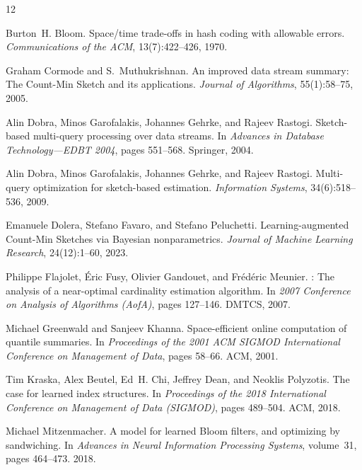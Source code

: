 \documentclass[preprint]{article}
\begin{document}
\begin{thebibliography}{12}

Burton~H. Bloom.
\newblock Space/time trade-offs in hash coding with allowable errors.
\newblock \emph{Communications of the ACM}, 13(7):422--426, 1970.

Graham Cormode and S.~Muthukrishnan.
\newblock An improved data stream summary: The {Count-Min Sketch} and its applications.
\newblock \emph{Journal of Algorithms}, 55(1):58--75, 2005.

Alin Dobra, Minos Garofalakis, Johannes Gehrke, and Rajeev Rastogi.
\newblock Sketch-based multi-query processing over data streams.
\newblock In \emph{Advances in Database Technology---EDBT 2004}, pages 551--568. Springer, 2004.

Alin Dobra, Minos Garofalakis, Johannes Gehrke, and Rajeev Rastogi.
\newblock Multi-query optimization for sketch-based estimation.
\newblock \emph{Information Systems}, 34(6):518--536, 2009.

Emanuele Dolera, Stefano Favaro, and Stefano Peluchetti.
\newblock Learning-augmented {Count-Min Sketches} via {Bayesian} nonparametrics.
\newblock \emph{Journal of Machine Learning Research}, 24(12):1--60, 2023.

Philippe Flajolet, \'{E}ric Fusy, Olivier Gandouet, and Fr\'{e}d\'{e}ric Meunier.
: The analysis of a near-optimal cardinality estimation algorithm.
\newblock In \emph{2007 Conference on Analysis of Algorithms (AofA)}, pages 127--146. DMTCS, 2007.

Michael Greenwald and Sanjeev Khanna.
\newblock Space-efficient online computation of quantile summaries.
\newblock In \emph{Proceedings of the 2001 ACM SIGMOD International Conference on Management of Data}, pages 58--66. ACM, 2001.

Tim Kraska, Alex Beutel, Ed~H. Chi, Jeffrey Dean, and Neoklis Polyzotis.
\newblock The case for learned index structures.
\newblock In \emph{Proceedings of the 2018 International Conference on Management of Data (SIGMOD)}, pages 489--504. ACM, 2018.

Michael Mitzenmacher.
\newblock A model for learned {Bloom} filters, and optimizing by sandwiching.
\newblock In \emph{Advances in Neural Information Processing Systems}, volume~31, pages 464--473. 2018.


\end{thebibliography}
\end{document}
